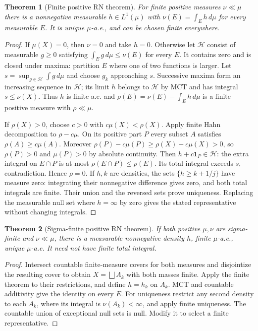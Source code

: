 \documentclass[11pt,oneside,openany]{book}
\newtheorem{theorem}{Theorem}[chapter]
\theoremstyle{definition}
\theoremstyle{remark}
\newcommand{\one}{\mathbf1}\newcommand{\ind}[1]{\mathbf1_{#1}}
\newcommand{\family}[1]{}
\begin{document}
\begin{theorem}[Finite positive RN theorem]\family{D11.15.rn_positive_finite}\label{d11:15:rn-positive-finite}
For finite positive measures $\nu\ll\mu$ there is a nonnegative measurable
$h\in L^1(\mu)$ with $\nu(E)=\int_Eh\,d\mu$ for every measurable $E$.
It is unique $\mu$-a.e., and can be chosen finite everywhere.
\end{theorem}
\begin{proof}
If $\mu(X)=0$, then $\nu=0$ and take $h=0$. Otherwise let $\mathcal H$
consist of measurable $g\geq0$ satisfying $\int_Eg\,d\mu\leq\nu(E)$ for
every $E$. It contains zero and is closed under maxima: partition $E$ where
one of two functions is larger. Let $s=\sup_{g\in\mathcal H}\int g\,d\mu$
and choose $g_k$ approaching $s$. Successive maxima form an increasing
sequence in $\mathcal H$; its limit $h$ belongs to $\mathcal H$ by MCT and
has integral $s\leq\nu(X)$. Thus $h$ is finite a.e. and
$\rho(E)=\nu(E)-\int_Eh\,d\mu$ is a finite positive measure with
$\rho\ll\mu$.

If $\rho(X)>0$, choose $c>0$ with $c\mu(X)<\rho(X)$. Apply finite Hahn
decomposition to $\rho-c\mu$. On its positive part $P$ every subset $A$
satisfies $\rho(A)\geq c\mu(A)$. Moreover
$\rho(P)-c\mu(P)\geq\rho(X)-c\mu(X)>0$, so $\rho(P)>0$ and
$\mu(P)>0$ by absolute continuity. Then $h+c\one_P\in\mathcal H$:
the extra integral on $E\cap P$ is at most $\rho(E\cap P)\leq\rho(E)$.
Its total integral exceeds $s$, contradiction. Hence $\rho=0$.
If $h,k$ are densities, the sets $\{h\geq k+1/j\}$ have measure zero:
integrating their nonnegative difference gives zero, and both total
integrals are finite. Their union and the reversed sets prove uniqueness.
Replacing the measurable null set where $h=\infty$ by zero gives the stated
representative without changing integrals.
\end{proof}

\begin{theorem}[Sigma-finite positive RN theorem]\family{D11.15.rn_positive_sigmafinite}\label{d11:15:rn-positive-sigmafinite}
If both positive $\mu,\nu$ are sigma-finite and $\nu\ll\mu$, there is a
measurable nonnegative density $h$, finite $\mu$-a.e., unique $\mu$-a.e.
It need not have finite total integral.
\end{theorem}
\begin{proof}
Intersect countable finite-measure covers for both measures and disjointize
the resulting cover to obtain $X=\bigsqcup A_k$ with both masses finite.
Apply the finite theorem to their restrictions, and define $h=h_k$ on
$A_k$. MCT and countable additivity give the identity on every $E$.
For uniqueness restrict any second density to each $A_k$, where its integral
is $\nu(A_k)<\infty$, and apply finite uniqueness. The countable union of
exceptional null sets is null. Modify it to select a finite representative.
\end{proof}
\end{document}
